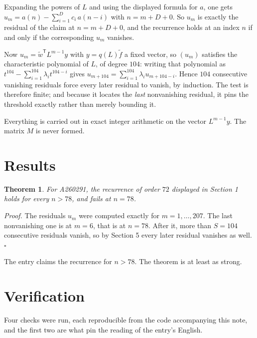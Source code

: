 \documentclass[11pt]{article}
\newtheorem{theorem}{Theorem}
\theoremstyle{definition}
\begin{document}
Expanding the powers of $L$ and using the displayed formula for $a$, one gets $u_m = a(n) - \sum_{i=1}^{D} c_i\,a(n-i)$ with $n = m + D + 0$. So $u_m$ is exactly the residual of the claim at $n = m + D + 0$, and the recurrence holds at an index $n$ if and only if the corresponding $u_m$ vanishes.

Now $u_m = \tilde w^{\mathsf T} L^{m-1} y$ with $y = q(L)\tilde f$ a fixed vector, so $(u_m)$ satisfies the characteristic polynomial of $L$, of degree $104$: writing that polynomial as $t^{104} - \sum_{i=1}^{104} \lambda_i t^{104-i}$ gives $u_{m+104} = \sum_{i=1}^{104} \lambda_i u_{m+104-i}$. Hence $104$ consecutive vanishing residuals force every later residual to vanish, by induction. The test is therefore finite; and because it locates the {\itshape last} nonvanishing residual, it pins the threshold exactly rather than merely bounding it.

Everything is carried out in exact integer arithmetic on the vector $L^{m-1}y$. The matrix $M$ is never formed.

\section{Results}

\begin{theorem} For A260291, the recurrence of order $72$ displayed in Section 1 holds for every $n > 78$, and fails at $n = 78$.\end{theorem}

{\itshape Proof.} The residuals $u_m$ were computed exactly for $m = 1,\dots,207$. The last nonvanishing one is at $m = 6$, that is at $n = 78$. After it, more than $S = 104$ consecutive residuals vanish, so by Section 5 every later residual vanishes as well. $\square$

The entry claims the recurrence for $n > 78$. The theorem is at least as strong.

\section{Verification}

Four checks were run, each reproducible from the code accompanying this note, and the first two are what pin the reading of the entry's English.
\end{document}
